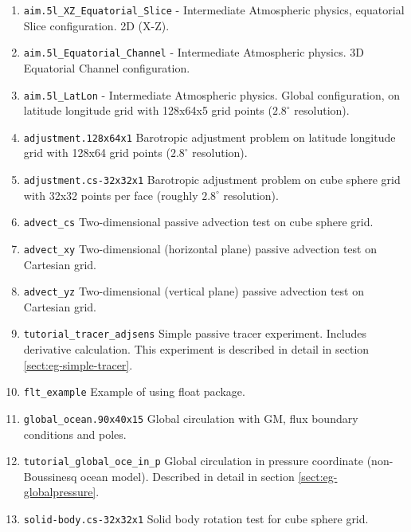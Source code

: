 \begin{enumerate}
\item \texttt{aim.5l\_XZ\_Equatorial\_Slice} - Intermediate
  Atmospheric physics, equatorial Slice configuration.  2D (X-Z).
  
\item \texttt{aim.5l\_Equatorial\_Channel} - Intermediate Atmospheric
  physics. 3D Equatorial Channel configuration.
  
\item \texttt{aim.5l\_LatLon} - Intermediate Atmospheric physics.
  Global configuration, on latitude longitude grid with 128x64x5 grid
  points ($2.8^\circ$ resolution).
  
\item \texttt{adjustment.128x64x1} Barotropic adjustment problem on
  latitude longitude grid with 128x64 grid points ($2.8^\circ$ resolution).
  
\item \texttt{adjustment.cs-32x32x1} Barotropic adjustment problem on
  cube sphere grid with 32x32 points per face (roughly $2.8^\circ$
  resolution).
  
\item \texttt{advect\_cs} Two-dimensional passive advection test on
  cube sphere grid.
  
\item \texttt{advect\_xy} Two-dimensional (horizontal plane) passive
  advection test on Cartesian grid.
  
\item \texttt{advect\_yz} Two-dimensional (vertical plane) passive
  advection test on Cartesian grid.
  
\item \texttt{tutorial\_tracer\_adjsens} Simple passive tracer experiment. Includes
  derivative calculation. This experiment is described in detail in section
  \ref{sect:eg-simple-tracer}.

\item \texttt{flt\_example} Example of using float package.
  
\item \texttt{global\_ocean.90x40x15} Global circulation with GM, flux
  boundary conditions and poles.

\item \texttt{tutorial\_global\_oce\_in\_p} Global circulation in pressure
  coordinate (non-Boussinesq ocean model). Described in detail in
  section \ref{sect:eg-globalpressure}.

\item \texttt{solid-body.cs-32x32x1} Solid body rotation test for cube
  sphere grid.


\end{enumerate}
